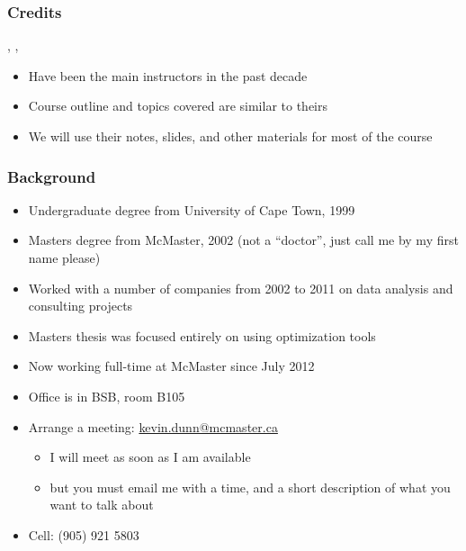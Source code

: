 
\begin{frame}\frametitle{Credits}
	\begin{exampleblock}{}
		\centering {\color{myOrange}{Dr. Thomas Marlin}}, {\color{myBlue}{Dr. Benoit Chachuat}}, {\color{myGreen}{Dr. San Yip}}
	\end{exampleblock}
	\begin{itemize}
		\item	Have been the main instructors in the past decade
		\item	Course outline and topics covered are similar to theirs
		\item	We will use their notes, slides, and other materials for most of the course
	\end{itemize}
\end{frame}

\begin{frame}\frametitle{Background}
	{\color{myGreen}{About myself}}
	\begin{itemize}
		\item	Undergraduate degree from University of Cape Town, 1999
		\item	Masters degree from McMaster, 2002 (not a ``doctor'', just call me by my first name please)
		\item	Worked with a number of companies from 2002 to 2011 on data analysis and consulting projects
		\item	Masters thesis was focused entirely on using optimization tools
		\item	Now working full-time at McMaster since July 2012
		\item	Office is in BSB, room B105
		\item	Arrange a meeting: \url{kevin.dunn@mcmaster.ca}
			\begin{itemize}
				\item	I will meet as soon as I am available
				\item	but you must email me with a time, and a short description of what you want to talk about
			\end{itemize}
		\item	Cell: (905) 921 5803
	\end{itemize}
\end{frame}


